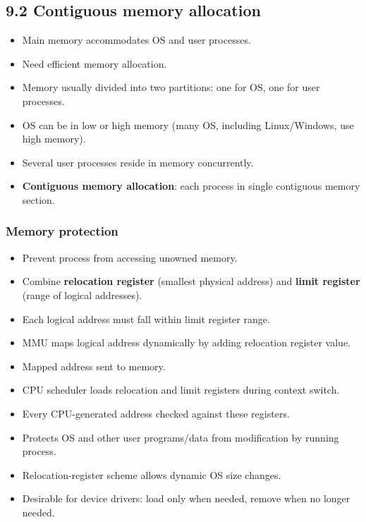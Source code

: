 \subsection{9.2 Contiguous memory allocation}

\begin{itemize}
    \item Main memory accommodates OS and user processes.
    \item Need efficient memory allocation.
    \item Memory usually divided into two partitions: one for OS, one for user processes.
    \item OS can be in low or high memory (many OS, including Linux/Windows, use high memory).
    \item Several user processes reside in memory concurrently.
    \item \textbf{Contiguous memory allocation}: each process in single contiguous memory section.
\end{itemize}

\subsubsection*{Memory protection}
\begin{itemize}
    \item Prevent process from accessing unowned memory.
    \item Combine \textbf{relocation register} (smallest physical address) and \textbf{limit register} (range of logical addresses).
    \item Each logical address must fall within limit register range.
    \item MMU maps logical address dynamically by adding relocation register value.
    \item Mapped address sent to memory.
    \item CPU scheduler loads relocation and limit registers during context switch.
    \item Every CPU-generated address checked against these registers.
    \item Protects OS and other user programs/data from modification by running process.
    \item Relocation-register scheme allows dynamic OS size changes.
    \item Desirable for device drivers: load only when needed, remove when no longer needed.
\end{itemize}

